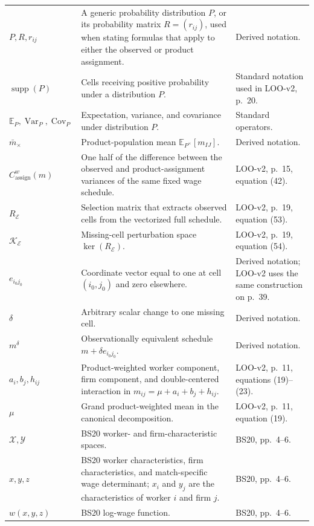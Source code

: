 \documentclass[11pt]{article}
\begin{document}
\begin{longtable}{p{}p{}p{}}
\(P,R,r_{ij}\) & A generic probability distribution \(P\), or its probability
matrix \(R=(r_{ij})\), used when stating formulas that apply to either the
observed or product assignment. & Derived notation. \\
\(\operatorname{supp}(P)\) & Cells receiving positive probability under a
distribution \(P\). & Standard notation used in LOO-v2, p.\ 20. \\
\(\mathbb E_P,\operatorname{Var}_P,\operatorname{Cov}_P\) & Expectation,
variance, and covariance under distribution \(P\). & Standard operators. \\
\(\bar m_\times\) & Product-population mean
\(\mathbb E_{P^\times}[m_{IJ}]\). & Derived notation. \\
\(C^w_{\mathrm{assign}}(m)\) & One half of the difference between the observed
and product-assignment variances of the same fixed wage schedule. &
LOO-v2, p.\ 15, equation (42). \\
\(R_{\mathcal E}\) & Selection matrix that extracts observed cells from the
vectorized full schedule. & LOO-v2, p.\ 19, equation (53). \\
\(\mathcal K_{\mathcal E}\) & Missing-cell perturbation space
\(\ker(R_{\mathcal E})\). & LOO-v2, p.\ 19, equation (54). \\
\(e_{i_0j_0}\) & Coordinate vector equal to one at cell \((i_0,j_0)\) and zero
elsewhere. & Derived notation; LOO-v2 uses the same construction on p.\ 39. \\
\(\delta\) & Arbitrary scalar change to one missing cell. & Derived notation. \\
\(m^\delta\) & Observationally equivalent schedule
\(m+\delta e_{i_0j_0}\). & Derived notation. \\
\(a_i,b_j,h_{ij}\) & Product-weighted worker component, firm component, and
double-centered interaction in
\(m_{ij}=\mu+a_i+b_j+h_{ij}\). & LOO-v2, p.\ 11, equations (19)--(23). \\
\(\mu\) & Grand product-weighted mean in the canonical decomposition. &
LOO-v2, p.\ 11, equation (19). \\
\(\mathcal X,\mathcal Y\) & BS20 worker- and firm-characteristic spaces. &
BS20, pp.\ 4--6. \\
\(x,y,z\) & BS20 worker characteristics, firm characteristics, and
match-specific wage determinant; \(x_i\) and \(y_j\) are the characteristics
of worker \(i\) and firm \(j\). & BS20, pp.\ 4--6. \\
\(w(x,y,z)\) & BS20 log-wage function. & BS20, pp.\ 4--6. \\

\end{longtable}
\end{document}
